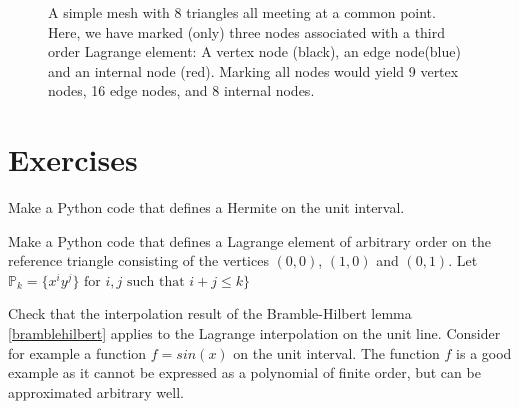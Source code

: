 \begin{figure}
\label{fig:Lagrange8elements}
\caption{A simple mesh with 8 triangles all meeting at a common point. 
Here, we have marked (only) three nodes associated with a third order Lagrange element: A vertex node (black), an edge node(blue) and an internal node (red).  
Marking all nodes would yield 9 vertex nodes,  16 edge nodes, and 8 internal nodes.  }
\end{figure}





\section{Exercises}
\begin{exercise}
\label{hermite:interval}
Make a Python code that defines a Hermite on the unit interval.       
\end{exercise}



\begin{exercise}
\label{lagrange:triangle}
Make a Python code that defines a Lagrange element of arbitrary order on the reference triangle 
consisting of the vertices $(0,0)$, $(1,0)$ and $(0,1)$. Let $\mathbb{P}_k = \{ x^i y^j \} \mbox{ for } i,j \mbox{ such that } i+j \le k\} $     
\end{exercise}

\begin{exercise}
Check that the interpolation result
of the Bramble-Hilbert lemma \ref{bramblehilbert} applies to the Lagrange interpolation on the unit line. Consider 
for example a function $f = sin(x)$ on the unit interval. The function $f$ is a good example as it cannot be expressed 
as a polynomial of finite order, but can be approximated arbitrary well. 
\end{exercise}

